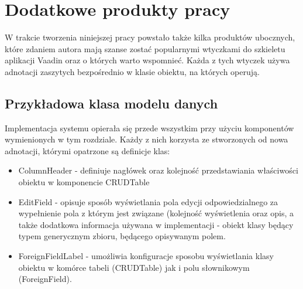 \chapter{Dodatkowe produkty pracy}
W trakcie tworzenia niniejszej pracy powstało także kilka produktów ubocznych, które zdaniem autora mają szanse zostać popularnymi wtyczkami do szkieletu aplikacji Vaadin oraz o których warto wspomnieć. Każda z tych wtyczek używa adnotacji zaszytych bezpośrednio w klasie obiektu, na których operują.

\section{Przykładowa klasa modelu danych}
Implementacja systemu opierała się przede wszystkim przy użyciu komponentów wymienionych w tym rozdziale. Każdy z nich korzysta ze stworzonych od nowa adnotacji, którymi opatrzone są definicje klas:
\begin{itemize}
\item ColumnHeader - definiuje nagłówek oraz kolejność przedstawiania właściwości obiektu w komponencie CRUDTable
\item EditField - opisuje sposób wyświetlania pola edycji odpowiedzialnego za wypełnienie pola z którym jest związane (kolejność wyświetlenia oraz opis, a także dodatkowa informacja używana w implementacji - obiekt klasy będący typem generycznym zbioru, będącego opisywanym polem.
\item ForeignFieldLabel - umożliwia konfiguracje sposobu wyświetlania klasy obiektu w komórce tabeli (CRUDTable) jak i polu słownikowym (ForeignField).
\end{itemize}


